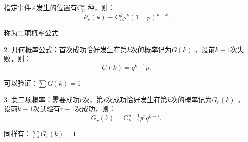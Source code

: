     指定事件$A$发生的位置有$\mathrm{C}_{n}^{k}$ 种，则：\[
        P_n\left( k \right) =\mathrm{C}_{n}^{k}p^{k}\left( 1-p \right) ^{n-k}
    .\] 

    称为二项概率公式

    2. 几何概率公式：首次成功恰好发生在第$k$次的概率记为$G\left( k \right) $ ，设前$k-1$次失败，则：\[
        G\left( k \right)= q^{k-1}p
    .\] 

    可以验证：$\sum G\left( k \right) =1$ 

    3. 负二项概率：需要成功$r$次，第$r$次成功恰好发生在第$k$次的概率记为$G_r\left( k \right) $ ，设前$k-1$次试验有$r-1$次成功，则：\[
        G_r\left( k \right) =\mathrm{C}_{k-1}^{n-1}p^rq^{k-r}
    .\] 

    同样有：$\sum G_r\left( k \right) =1$

